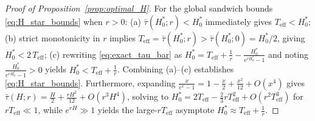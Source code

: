 \begin{proof}[Proof of Proposition~\ref{prop:optimal_H}]
For the global sandwich bounds \eqref{eq:H_star_bounds} when $r > 0$:
(a) $\bar\tau(H_0^\ast;r) < H_0^\ast$ immediately gives $T_{\mathrm{eff}} < H_0^\ast$;
(b) strict monotonicity in $r$ implies $T_{\mathrm{eff}} = \bar\tau(H_0^\ast;r) > \bar\tau(H_0^\ast;0) = H_0^\ast/2$, giving $H_0^\ast < 2\,T_{\mathrm{eff}}$;
(c) rewriting \eqref{eq:exact_tau_bar} as $H_0^\ast = T_{\mathrm{eff}} + \frac{1}{r} - \frac{H_0^\ast}{e^{rH_0^\ast}-1}$ and noting $\frac{H_0^\ast}{e^{rH_0^\ast}-1} > 0$ yields $H_0^\ast < T_{\mathrm{eff}} + \frac{1}{r}$.
Combining (a)--(c) establishes \eqref{eq:H_star_bounds}.
Furthermore, expanding $\frac{x}{e^x-1} = 1 - \frac{x}{2} + \frac{x^2}{12} + O(x^4)$ gives $\bar\tau(H;r) = \frac{H}{2} + \frac{rH^2}{12} + O(r^3 H^4)$, solving to $H_0^\ast = 2T_{\mathrm{eff}} - \frac{2}{3}rT_{\mathrm{eff}}^2 + O(r^2 T_{\mathrm{eff}}^3)$ for $rT_{\mathrm{eff}} \ll 1$, while $e^{rH}\gg 1$ yields the large-$rT_{\mathrm{eff}}$ asymptote $H_0^\ast \approx T_{\mathrm{eff}} + \frac{1}{r}$.


\end{proof}
